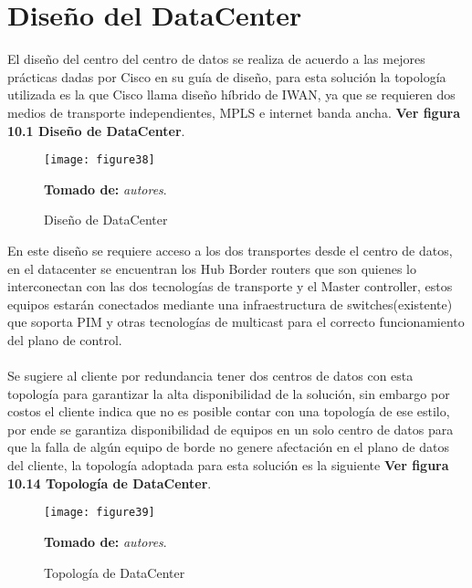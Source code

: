 \section{Diseño del DataCenter}
\label{sec:Diseño del DataCenter}

El diseño del centro del centro de datos se realiza de acuerdo a las mejores prácticas dadas por Cisco en su guía de diseño, para esta solución la topología utilizada es la que Cisco llama diseño híbrido de IWAN, ya que se requieren dos medios de transporte independientes, MPLS e internet banda ancha. \textbf{Ver figura 10.1 Diseño de DataCenter}.
\begin{figure}[htbp]
  \centering
    {\texttt{[image: figure38]}}%
  \caption{Diseño de DataCenter}
   \textbf{Tomado de:} \textit{autores}.
  \label{fig:fig2subfig}
\end{figure}

En este diseño se requiere acceso a los dos transportes desde el centro de datos, en el datacenter se encuentran los Hub Border routers que son quienes lo interconectan con las dos tecnologías de transporte y el Master controller, estos equipos estarán conectados mediante una infraestructura de switches(existente) que soporta PIM y otras tecnologías de multicast para el correcto funcionamiento del plano de control.
\\
\\
Se sugiere al cliente por redundancia tener dos centros de datos con esta topología para garantizar la alta disponibilidad de la solución, sin embargo por costos el cliente indica que no es posible contar con una topología de ese estilo, por ende se garantiza disponibilidad de equipos en un solo centro de datos para que la falla de algún equipo de borde no genere afectación en el plano de datos del cliente, la topología adoptada para esta solución es la siguiente \textbf{Ver figura 10.14 Topología de DataCenter}.

\begin{figure}[htbp]
  \centering
    {\texttt{[image: figure39]}}%
  \caption{Topología de DataCenter}
   \textbf{Tomado de:} \textit{autores}.
  \label{fig:fig2subfig}
\end{figure}

